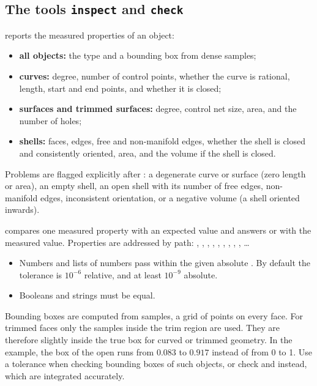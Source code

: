 \subsection{The tools \texttt{inspect} and \texttt{check}}

 reports the measured properties of an object:
\begin{itemize}
  \item \textbf{all objects:} the type and a bounding box from dense samples;
  \item \textbf{curves:} degree, number of control points, whether the curve is rational,
    length, start and end points, and whether it is closed;
  \item \textbf{surfaces and trimmed surfaces:} degree, control net size, area, and the number
    of holes;
  \item \textbf{shells:} faces, edges, free and non-manifold edges, whether the shell is closed
    and consistently oriented, area, and the volume if the shell is closed.
\end{itemize}
Problems are flagged explicitly after : a degenerate curve or surface (zero
length or area), an empty shell, an open shell with its number of free edges, non-manifold
edges, inconsistent orientation, or a negative volume (a shell oriented inwards).

 compares one measured property with an expected value and answers 
or  with the measured value. Properties are addressed by path: ,
, , , , , ,
, , \dots{}
\begin{itemize}
  \item Numbers and lists of numbers pass within the given absolute . By
    default the tolerance is $10^{-6}$ relative, and at least $10^{-9}$ absolute.
  \item Booleans and strings must be equal.
\end{itemize}

\begin{note}
Bounding boxes are computed from samples, a grid of points on every face. For trimmed faces
only the samples inside the trim region are used. They are therefore slightly inside the true
box for curved or trimmed geometry. In the example, the box of the open  runs from
$0.083$ to $0.917$ instead of from 0 to 1. Use a tolerance when checking bounding boxes of such
objects, or check  and  instead, which are integrated accurately.
\end{note}

